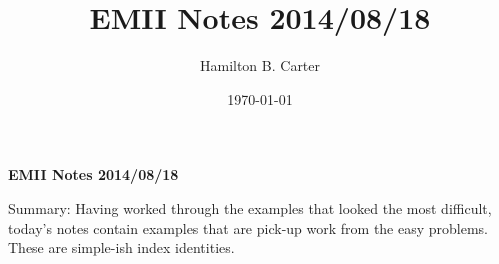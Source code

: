 \documentclass[prb,preprint]
{revtex4-1}
\begin{document}

\title{EMII Notes 2014/08/18}

\author{Hamilton B. Carter}



\date{\today}









\centerline{\bf EMII Notes 2014/08/18}
\bigskip

Summary:  Having worked through the examples that looked the most difficult, today's notes contain examples that are pick-up work from the easy problems.  These are simple-ish index identities.\\\\
\end{document}
